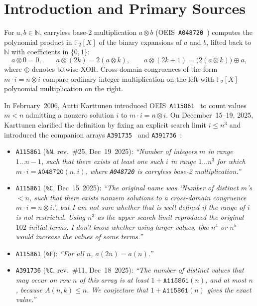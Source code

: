 \documentclass[11pt]{article}
\theoremstyle{definition}
\newcommand{\N}{\mathbb{N}}
\newcommand{\F}{\mathbb{F}}
\newcommand{\seq}[1]{\texttt{#1}}
\newcommand{\clmul}{\otimes}
\begin{document}
\section{Introduction and Primary Sources}

For $a, b \in \N$, carryless base-$2$ multiplication $a \clmul b$ (OEIS~\seq{A048720}~\cite{oeis048720}) computes the polynomial product in $\F_2[X]$ of the binary expansions of $a$ and $b$, lifted back to $\N$ with coefficients in $\{0, 1\}$:
\[
a \clmul 0 = 0, \qquad a \clmul (2k) = 2(a \clmul k), \qquad a \clmul (2k + 1) = \bigl(2(a \clmul k)\bigr) \oplus a,
\]
where $\oplus$ denotes bitwise XOR. Cross-domain congruences of the form $m \cdot i = n \clmul i$ compare ordinary integer multiplication on the left with $\F_2[X]$ polynomial multiplication on the right.

In February~2006, Antti Karttunen introduced OEIS~\seq{A115861}~\cite{oeis115861} to count values $m < n$ admitting a nonzero solution $i$ to $m \cdot i = n \clmul i$. On December~15--19, 2025, Karttunen clarified the definition by fixing an explicit search limit $i \le n^3$ and introduced the companion arrays \seq{A391735}~\cite{oeis391735} and \seq{A391736}~\cite{oeis391736}:
\begin{itemize}
\item \seq{A115861} (\texttt{\%N}, rev.~\#25, Dec~19~2025): \emph{``Number of integers $m$ in range $1 \dots n-1$, such that there exists at least one such $i$ in range $1 \dots n^3$ for which $m \cdot i = \seq{A048720}(n, i)$, where \seq{A048720} is carryless base-2 multiplication.''}
\item \seq{A115861} (\texttt{\%C}, Dec~15~2025): \emph{``The original name was `Number of distinct $m$'s $< n$, such that there exists nonzero solutions to a cross-domain congruence $m \cdot i = n \clmul i$.', but I am not sure whether that is well defined if the range of $i$ is not restricted. Using $n^3$ as the upper search limit reproduced the original $102$ initial terms. I don't know whether using larger values, like $n^4$ or $n^5$ would increase the values of some terms.''}
\item \seq{A115861} (\texttt{\%F}): \emph{``For all $n$, $a(2n) = a(n)$.''}
\item \seq{A391736} (\texttt{\%C}, rev.~\#11, Dec~18~2025): \emph{``The number of distinct values that may occur on row $n$ of this array is at least $1 + \seq{A115861}(n)$, and at most $n$, because $A(n, k) \le n$. We conjecture that $1 + \seq{A115861}(n)$ gives the exact value.''}
\end{itemize}
\end{document}
